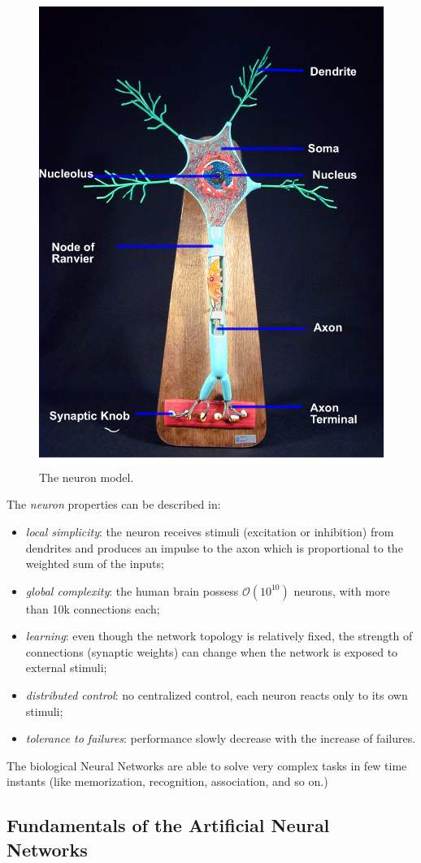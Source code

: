 \begin{figure}[t]
\centering
\includegraphics[width=0.5\linewidth]{img/neuron_model}
\caption[Neuron Model]{The neuron model.}
\label{fig:neuron}
\end{figure}

The \textit{neuron} properties can be described in:
\begin{itemize}
\item \textit{local simplicity}: the neuron receives stimuli (excitation or inhibition) from dendrites and produces an impulse to the axon which is proportional to the weighted sum of the inputs;
\item \textit{global complexity}: the human brain possess 
$\mathcal{O}(10^{10})$ 
neurons, with more than 10k connections each;
\item \textit{learning}: even though the network topology is relatively fixed, the strength of connections (synaptic weights) can change when the network is exposed to external stimuli;
\item \textit{distributed control}: no centralized control, each neuron reacts only to its own stimuli;
\item \textit{tolerance to failures}: performance slowly decrease with the increase of failures.
\end{itemize}

The biological Neural Networks are able to solve very complex tasks in few time instants (like memorization, recognition, association, and so on.)

\subsection{Fundamentals of the Artificial Neural Networks} 

